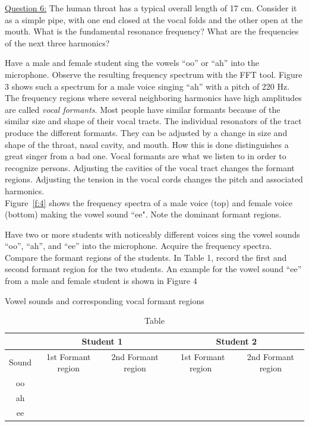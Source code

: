 \documentclass[11pt]{NSF}
\begin{document}
\underline{Question 6:} The human throat has a typical overall length of 17 cm. Consider
it as a simple pipe, with one end closed at the vocal folds and the
other open at the mouth. What is the fundamental resonance frequency?
What are the frequencies of the next three harmonics?

Have a male and female student sing the vowels “oo” or “ah” into the microphone. Observe the
resulting frequency spectrum with the FFT tool. Figure 3 shows such a spectrum for a male voice
singing “ah” with a pitch of 220 Hz. \\

The frequency regions where several neighboring harmonics have high
amplitudes are called {\em vocal formants}. Most people have similar
formants because of the similar size and shape of their vocal tracts. 
The individual resonators of the tract produce the different formants.
They can be adjusted by a change in size and shape of the throat,
nasal cavity, and mouth. How this is done distinguishes a great singer
from a bad one. Vocal formants are what we listen to in order to
recognize persons. Adjusting the cavities of the vocal tract changes
the formant regions. Adjusting the tension in the vocal cords changes
the pitch and associated harmonics. \\

Figure~\ref{f:4} shows the frequency spectra of a male voice (top) 
and female voice (bottom) making the vowel sound ``ee".
Note the dominant formant regions.

Have two or more students with noticeably different voices sing the vowel sounds “oo”,
“ah”, and “ee” into the microphone. Acquire the frequency spectra. Compare the formant
regions of the students. In Table 1, record the first and second formant region for the two
students. An example for the vowel sound “ee” from a male and female student is shown in
Figure 4

\begin{table}[hbtp]
\begin{center}
Vowel sounds and corresponding vocal formant regions\\
\begin{tabular}{| c | c | c | c | c | }
\hline
&\multicolumn{2}{c}{Student 1} \vrule
&\multicolumn{2}{c}{Student 2} \vrule\\
\hline
Sound & \phantom{ }1st Formant region \phantom{ } & 2nd Formant region & \phantom{ }1st Formant region\phantom{ }\  & 2nd Formant region\\
\hline
oo &  &  &  &  \\
\hline
ah  &  &  &  &  \\
\hline
ee  &  &  &  &  \\
\hline
\end{tabular}
\caption{Table}
\label{t:1}
\end{center}
\end{table}
\end{document}
